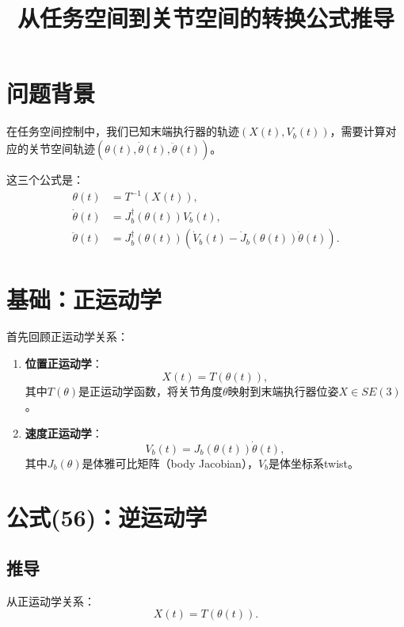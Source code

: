 \documentclass{article}
\title{从任务空间到关节空间的转换公式推导}
\author{}
\date{}
\begin{document}
\maketitle

\section{问题背景}

在任务空间控制中，我们已知末端执行器的轨迹$(X(t), V_b(t))$，需要计算对应的关节空间轨迹$(\theta(t), \dot{\theta}(t), \ddot{\theta}(t))$。

这三个公式是：
\begin{align}
\theta(t) &= T^{-1}(X(t)), \tag{56} \\
\dot{\theta}(t) &= J_b^{\dagger}(\theta(t))V_b(t), \tag{57} \\
\ddot{\theta}(t) &= J_b^{\dagger}(\theta(t))\left(\dot{V}_b(t) - \dot{J}_b(\theta(t))\dot{\theta}(t)\right). \tag{58}
\end{align}

\section{基础：正运动学}

首先回顾正运动学关系：

\begin{enumerate}
\item \textbf{位置正运动学}：
\begin{equation}
X(t) = T(\theta(t)),
\end{equation}
其中$T(\theta)$是正运动学函数，将关节角度$\theta$映射到末端执行器位姿$X \in SE(3)$。

\item \textbf{速度正运动学}：
\begin{equation}
V_b(t) = J_b(\theta(t))\dot{\theta}(t),
\end{equation}
其中$J_b(\theta)$是体雅可比矩阵（body Jacobian），$V_b$是体坐标系twist。
\end{enumerate}

\section{公式(56)：逆运动学}

\subsection{推导}

从正运动学关系：
\begin{equation}
X(t) = T(\theta(t)).
\end{equation}
\end{document}
